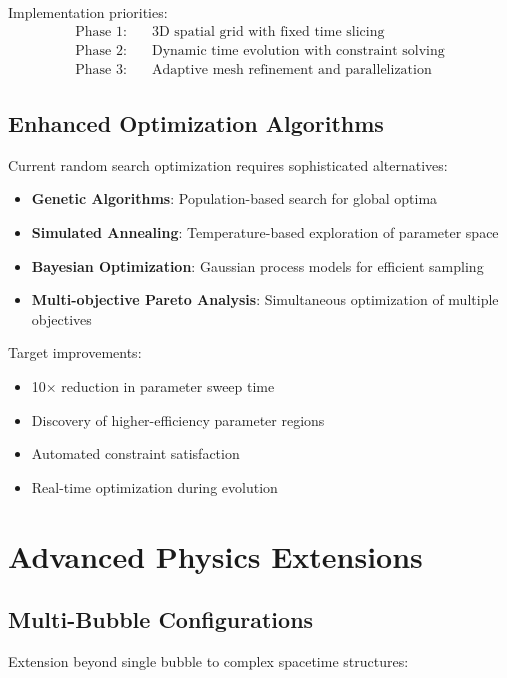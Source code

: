 \documentclass[11pt]{article}
\begin{document}
Implementation priorities:
\begin{align}
\text{Phase 1:} &\quad \text{3D spatial grid with fixed time slicing} \\
\text{Phase 2:} &\quad \text{Dynamic time evolution with constraint solving} \\
\text{Phase 3:} &\quad \text{Adaptive mesh refinement and parallelization}
\end{align}

\subsection{Enhanced Optimization Algorithms}

Current random search optimization requires sophisticated alternatives:

\begin{itemize}
\item \textbf{Genetic Algorithms}: Population-based search for global optima
\item \textbf{Simulated Annealing}: Temperature-based exploration of parameter space
\item \textbf{Bayesian Optimization}: Gaussian process models for efficient sampling
\item \textbf{Multi-objective Pareto Analysis}: Simultaneous optimization of multiple objectives
\end{itemize}

Target improvements:
\begin{itemize}
\item 10× reduction in parameter sweep time
\item Discovery of higher-efficiency parameter regions
\item Automated constraint satisfaction
\item Real-time optimization during evolution
\end{itemize}

\section{Advanced Physics Extensions}

\subsection{Multi-Bubble Configurations}

Extension beyond single bubble to complex spacetime structures:
\end{document}
